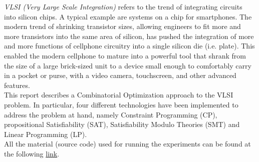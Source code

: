 \textit{VLSI (Very Large Scale Integration)} refers to the trend of integrating circuits into
silicon chips. A typical example are systems on a chip for smartphones. The modern trend of
shrinking transistor sizes, allowing engineers to fit more and more transistors into the same area 
of silicon, has pushed the integration of more and more functions of cellphone circuitry into a 
single silicon die (i.e. plate). This enabled the modern cellphone to mature into a powerful tool 
that shrank from the size of a large brick-sized unit to a device small enough to comfortably carry
in a pocket or purse, with a video camera, touchscreen, and other advanced features. \\

This report describes a Combinatorial Optimization approach to the VLSI problem. In particular,
four different technologies have been implemented to address the problem at hand, namely Constraint
Programming (CP), propositional Satisfiability (SAT), Satisfiability Modulo Theories (SMT) and
Linear Programming (LP). \\

All the material (source code) used for running the experiments can be found at the following
\href{https://github.com/contimatteo/VLSI}{link}.
